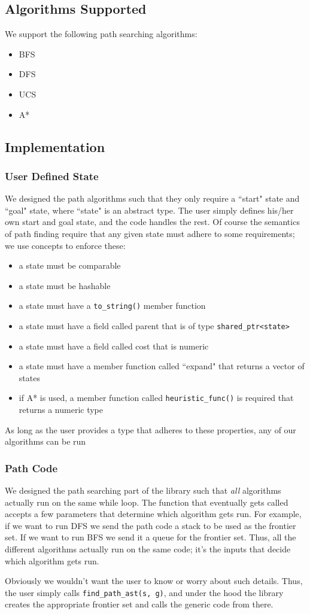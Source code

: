 \documentclass[12pt]{article}
\begin{document}
\subsection{Algorithms Supported}
We support the following path searching algorithms: 
\begin{itemize}
\item BFS
\item DFS
\item UCS
\item A*
\end{itemize}

\subsection{Implementation}
\subsubsection{User Defined State}
We designed the path algorithms such that they only require a ``start" state and ``goal" state, where ``state" is an abstract type. The user simply defines his/her own start and goal state, and the code handles the rest. Of course the semantics of path finding require that any given state must adhere to some requirements; we use concepts to enforce these:
\begin{itemize}
\item a state must be comparable
\item a state must be hashable
\item a state must have a \texttt{to\_string()} member function
\item a state must have a field called parent that is of type \texttt{shared\_ptr<state>}
\item a state must have a field called cost that is numeric
\item a state must have a member function called ``expand" that returns a vector of states
\item if A* is used, a member function called \texttt{heuristic\_func()} is required that returns a numeric type
\end{itemize}
As long as the user provides a type that adheres to these properties, any of our algorithms can be run

\subsubsection{Path Code}
We designed the path searching part of the library such that \emph{all} algorithms actually run on the same while loop. The function that eventually gets called accepts a few parameters that determine which algorithm gets run. For example, if we want to run DFS we send the path code a stack to be used as the frontier set. If we want to run BFS we send it a queue for the frontier set. Thus, all the different algorithms actually run on the same code; it's the inputs that decide which algorithm gets run. 
\par
Obviously we wouldn't want the user to know or worry about such details. Thus, the user simply calls \texttt{find\_path\_ast(s, g)}, and under the hood the library creates the appropriate frontier set and calls the generic code from there.
\end{document}
